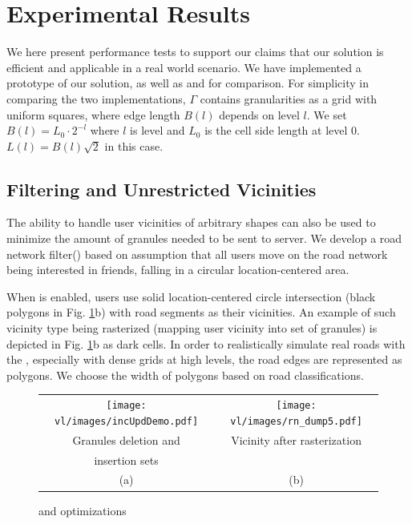 \section{Experimental Results}\label{sec:performStudy}
We here present performance tests
to support our claims that our solution
is efficient and applicable in a real world
scenario. We have implemented a prototype of our solution, as well as
\hc \cite{pbsPaper} and \ff \cite{ffinder} for comparison.
For simplicity in comparing the two implementations,
$\Gamma$ contains granularities as a grid with uniform squares, 
where edge length $B(l)$ depends on level $l$.
We set $B(l)=L_0\cdot2^{-l}$ where $l$ is level and $L_0$ is the cell side
length at level 0. $L(l)=B(l)\sqrt{2}$ in this case.  


\subsection{Filtering and Unrestricted Vicinities}
The \vls ability to handle user vicinities of arbitrary shapes can also be
used to minimize the amount of granules needed to be sent to server. We
develop a road network filter(\rf) based on assumption that all users move on
the road network being interested in friends, falling in a circular
location-centered area.

When \rf is enabled, users use solid location-centered circle intersection
(black polygons in Fig. \ref{fig:ui_rf}b) with road segments as their
vicinities. An example of such vicinity type being rasterized (mapping user vicinity into
set of granules) is depicted in Fig. \ref{fig:ui_rf}b as dark cells. In order to
realistically simulate real roads with the \rf, especially with dense grids at
high levels, the road edges are represented as polygons. We
choose the width of polygons based on road classifications.



\begin{figure}
       \center
       \begin{tabular}{cc}	
			  \texttt{[image: vl/images/incUpdDemo.pdf]} &
	   		\texttt{[image: vl/images/rn\_dump5.pdf]} \\	 
	   		\footnotesize Granules deletion and 				  &	\footnotesize Vicinity after rasterization \\
        \footnotesize insertion sets									& \\
           (a) & (b) \\
               
       \end{tabular}
       \caption{\iu and \rf optimizations}
  \label{fig:ui_rf}
\end{figure}


